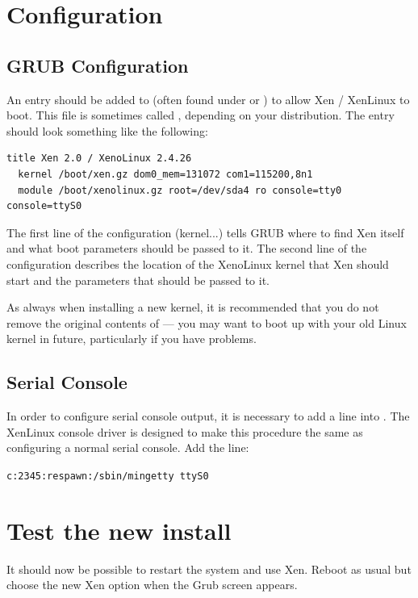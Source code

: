 \documentclass[11pt,twoside,final,openright]{xenstyle}
\begin{document}
\section{Configuration}

\subsection{GRUB Configuration}

An entry should be added to  (often found under
 or ) to allow Xen / XenLinux to boot.
This file is sometimes called , depending on your
distribution.  The entry should look something like the following:

\begin{verbatim}
title Xen 2.0 / XenoLinux 2.4.26
  kernel /boot/xen.gz dom0_mem=131072 com1=115200,8n1
  module /boot/xenolinux.gz root=/dev/sda4 ro console=tty0 console=ttyS0
\end{verbatim}

The first line of the configuration (kernel...) tells GRUB where to
find Xen itself and what boot parameters should be passed to it.  The
second line of the configuration describes the location of the
XenoLinux kernel that Xen should start and the parameters that should
be passed to it.

As always when installing a new kernel, it is recommended that you do
not remove the original contents of  --- you may want
to boot up with your old Linux kernel in future, particularly if you
have problems.

\subsection{Serial Console}

In order to configure serial console output, it is necessary to add a
line into .  The XenLinux console driver is
designed to make this procedure the same as configuring a normal
serial console.  Add the line:

{\tt c:2345:respawn:/sbin/mingetty ttyS0}

\section{Test the new install}

It should now be possible to restart the system and use Xen.  Reboot
as usual but choose the new Xen option when the Grub screen appears.
\end{document}
